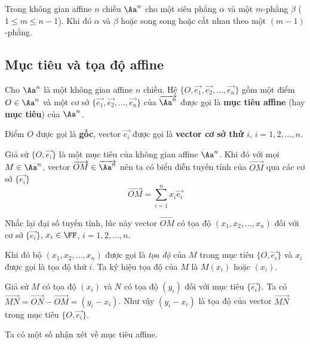 \begin{theorem}
    Trong không gian affine $n$ chiều $\Aa^n$ cho một siêu phẳng $\alpha$ và một $m$-phẳng $\beta$ ($1 \leq m \leq n-1$). Khi đó $\alpha$ và $\beta$ hoặc song song hoặc cắt nhau theo một $(m-1)$-phẳng.
\end{theorem}

\subsection*{Mục tiêu và tọa độ affine}

\begin{definition}
    Cho $\Aa^n$ là một không gian affine $n$ chiều. Hệ $\{O, \overrightarrow{e_1}, \overrightarrow{e_2}, \ldots, \overrightarrow{e_n}\}$ gồm một điểm $O \in \Aa^n$ và một cơ sở $\{\overrightarrow{e_1}, \overrightarrow{e_2}, \ldots, \overrightarrow{e_n}\}$ của $\overrightarrow{\Aa^n}$ được gọi là \textbf{mục tiêu affine} (hay \textbf{mục tiêu}) của $\Aa^n$.
    
    Điểm $O$ được gọi là \textbf{gốc}, vector $\overrightarrow{e_i}$ được gọi là \textbf{vector cơ sở thứ $i$}, $i = 1, 2, \ldots, n$. 
\end{definition}

Giả sử $\{O, \overrightarrow{e_i}\}$ là một mục tiêu của không gian affine $\Aa^n$. Khi đó với mọi $M \in \Aa^n$, vector $\overrightarrow{OM} \in \overrightarrow{\Aa^n}$ nên ta có biểu diễn tuyến tính của $\overrightarrow{OM}$ qua các cơ sở $\{\overrightarrow{e_i}\}$ \[\overrightarrow{OM} = \sum_{i=1}^n x_i \overrightarrow{e_i}\]

Nhắc lại đại số tuyến tính, lúc này vector $\overrightarrow{OM}$ có tọa độ $(x_1, x_2, \ldots, x_n)$ đối với cơ sở $\{\overrightarrow{e_i}\}$, $x_i \in \FF$, $i = 1, 2, \ldots, n$.

Khi đó bộ $(x_1, x_2, \ldots, x_n)$ được gọi là \textit{tọa độ} của $M$ trong mục tiêu $\{O, \overrightarrow{e_i}\}$ và $x_i$ được gọi là tọa độ thứ $i$. Ta ký hiệu tọa độ của $M$ là $M(x_i)$ hoặc $(x_i)$.

Giả sử $M$ có tọa độ $(x_i)$ và $N$ có tọa độ $(y_i)$ đối với mục tiêu $\{\overrightarrow{e_i}\}$. Ta có $\overrightarrow{MN} = \overrightarrow{ON} - \overrightarrow{OM} = (y_i - x_i)$. Như vậy $(y_i - x_i)$ là tọa độ của vector $\overrightarrow{MN}$ trong mục tiêu $\{O, \overrightarrow{e_i}\}$.

Ta có một số nhận xét về mục tiêu affine.

